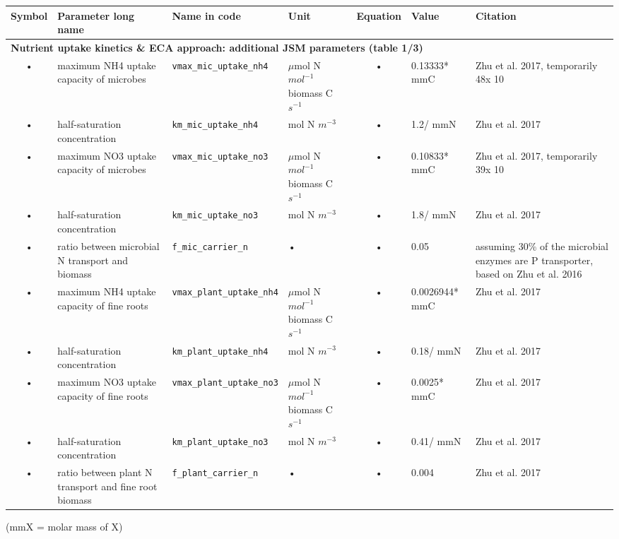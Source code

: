 \begin{table}
\begin{tabularx}{\linewidth}{|c|X|l|l|c|l|X|} %
\hline 
Symbol & Parameter long name & Name in code & Unit & Equation & Value & Citation \\ 
\hline 

\multicolumn{6}{l}{\bf Nutrient uptake kinetics \& ECA approach: additional JSM parameters (table 1/3)}\\
\hline
• & maximum NH4 uptake capacity of microbes & \texttt{vmax\_mic\_uptake\_nh4} & $\mu$mol N $mol^{-1}$ biomass C $s^{-1}$ & • & 0.13333* mmC & Zhu et al. 2017, temporarily 48x 10 \\
• & half-saturation concentration & \texttt{km\_mic\_uptake\_nh4} & mol N $m^{-3}$ & • & 1.2/ mmN & Zhu et al. 2017 \\
• & maximum NO3 uptake capacity of microbes & \texttt{vmax\_mic\_uptake\_no3} & $\mu$mol N $mol^{-1}$ biomass C $s^{-1}$ & • & 0.10833* mmC & Zhu et al. 2017, temporarily 39x 10 \\
• & half-saturation concentration & \texttt{km\_mic\_uptake\_no3} & mol N $m^{-3}$ & • & 1.8/ mmN & Zhu et al. 2017 \\
• & ratio between microbial N transport and biomass & \texttt{f\_mic\_carrier\_n} & • & • & 0.05 & assuming 30\% of the microbial enzymes are P transporter, based on Zhu et al. 2016 \\
• & maximum NH4 uptake capacity of fine roots & \texttt{vmax\_plant\_uptake\_nh4} & $\mu$mol N $mol^{-1}$ biomass C $s^{-1}$ & • & 0.0026944* mmC & Zhu et al. 2017 \\
• & half-saturation concentration & \texttt{km\_plant\_uptake\_nh4} & mol N $m^{-3}$ & • & 0.18/ mmN & Zhu et al. 2017 \\
• & maximum NO3 uptake capacity of fine roots & \texttt{vmax\_plant\_uptake\_no3} & $\mu$mol N $mol^{-1}$ biomass C $s^{-1}$ & • & 0.0025* mmC & Zhu et al. 2017 \\
• & half-saturation concentration & \texttt{km\_plant\_uptake\_no3} & mol N $m^{-3}$ & • & 0.41/ mmN & Zhu et al. 2017 \\
• & ratio between plant N transport and fine root biomass & \texttt{f\_plant\_carrier\_n} & • & • & 0.004 & Zhu et al. 2017 \\
\hline 
\end{tabularx}
(mmX = molar mass of X)
\end{table}


